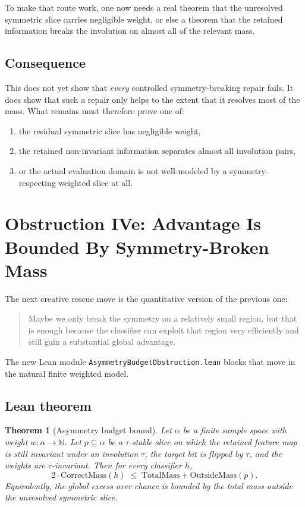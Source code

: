 \documentclass[11pt]{article}
\newtheorem{theorem}{Theorem}[section]
\theoremstyle{remark}
\begin{document}
To make that route work, one now needs a real theorem that the unresolved symmetric slice carries
negligible weight, or else a theorem that the retained information breaks the involution on almost
all of the relevant mass.

\subsection{Consequence}

This does not yet show that \emph{every} controlled symmetry-breaking repair fails.  It does show
that such a repair only helps to the extent that it resolves most of the mass.  What remains must
therefore prove one of:
\begin{enumerate}[leftmargin=1.5em]
  \item the residual symmetric slice has negligible weight,
  \item the retained non-invariant information separates almost all involution pairs,
  \item or the actual evaluation domain is not well-modeled by a symmetry-respecting weighted
  slice at all.
\end{enumerate}

\section{Obstruction IVe: Advantage Is Bounded By Symmetry-Broken Mass}

The next creative rescue move is the quantitative version of the previous one:
\begin{quote}
Maybe we only break the symmetry on a relatively small region, but that is enough because the
classifier can exploit that region very efficiently and still gain a substantial global advantage.
\end{quote}

The new Lean module \texttt{AsymmetryBudgetObstruction.lean} blocks that move in the natural
finite weighted model.

\subsection{Lean theorem}

\begin{theorem}[Asymmetry budget bound]
Let \(\alpha\) be a finite sample space with weight \(w : \alpha \to \mathbb{N}\).  Let
\(p \subseteq \alpha\) be a \(\tau\)-stable slice on which the retained feature map is still
invariant under an involution \(\tau\), the target bit is flipped by \(\tau\), and the weights are
\(\tau\)-invariant.  Then for every classifier \(h\),
\[
  2 \cdot \mathrm{CorrectMass}(h)
  \;\le\;
  \mathrm{TotalMass} + \mathrm{OutsideMass}(p).
\]
Equivalently, the global excess over chance is bounded by the total mass outside the unresolved
symmetric slice.
\end{theorem}
\end{document}

